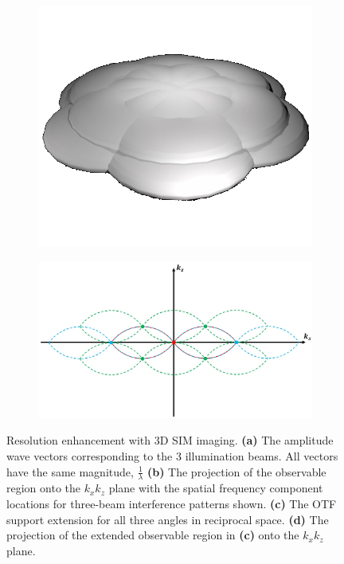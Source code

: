 \begin{figure}[h]
	\begin{subfigure}[t]{0.35\textwidth}
		\centering
		\includegraphics[width=\linewidth]{images/3D_SIM_OTF_all_angles.png}
		\caption{}
		\label{fig:3D_SIM_OTF_all_angles}
	\end{subfigure}
	\begin{subfigure}[t]{0.625\textwidth}
		\centering
		\includegraphics[width=\linewidth]{images/3D_SIM_OTF_1_angle_2D_plot.jpg}
		\caption{}
		\label{fig:3D_SIM_OTF_1_angle_2D_plot}
	\end{subfigure}	
	\caption[Resolution enhancement with 3D SIM imaging]{Resolution enhancement 
		with 3D SIM imaging. \textbf{(a)} The amplitude wave vectors 
		corresponding to the 3 illumination beams. All vectors have the 
		same magnitude, $\frac{1}{\lambda}$ \textbf{(b)} The projection of the 
		observable region onto the $k_{x}k_{z}$ plane with the spatial frequency 
		component locations for three-beam interference patterns shown. 
		\textbf{(c)} The OTF support extension for all three angles in reciprocal 
		space. \textbf{(d)} The projection of the extended observable region in 
		\textbf{(c)} onto the $k_{x}k_{z}$ plane.}
	\label{fig:3D_SIM_visualisation}
\end{figure}

